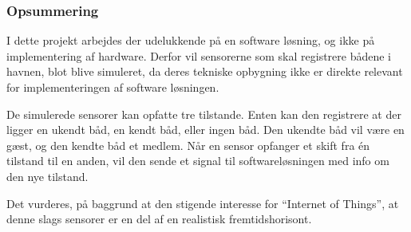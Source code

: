 \subsubsection{Opsummering}

I dette projekt arbejdes der udelukkende på en software løsning, og ikke på implementering af hardware. Derfor vil sensorerne som skal registrere bådene i havnen, blot blive simuleret, da deres tekniske opbygning ikke er direkte relevant for implementeringen af software løsningen. 

De simulerede sensorer kan opfatte tre tilstande. Enten kan den registrere at der ligger en ukendt båd, en kendt båd, eller ingen båd. Den ukendte båd vil være en gæst, og den kendte båd et medlem. Når en sensor opfanger et skift fra én tilstand til en anden, vil den sende et signal til softwareløsningen med info om den nye tilstand.

Det vurderes, på baggrund at den stigende interesse for \enquote{Internet of Things}, at denne slags sensorer er en del af en realistisk fremtidshorisont. 
